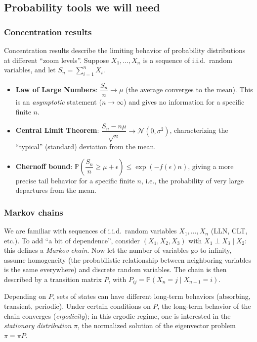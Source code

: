 \subsection{Probability tools we will need}

\subsubsection*{Concentration results}

Concentration results describe the limiting behavior of probability distributions at different ``zoom levels''. Suppose $X_1, \dots, X_n$ is a sequence of i.i.d.\ random variables, and let $S_n = \sum_{i=1}^n X_i$.

\begin{itemize}
    \item \textbf{Law of Large Numbers}: $\dfrac{S_n}{n} \to \mu$ (the average converges to the mean). This is an \emph{asymptotic} statement ($n \to \infty$) and gives no information for a specific finite $n$.
    \item \textbf{Central Limit Theorem}: $\dfrac{S_n - n\mu}{\sqrt{n}} \to \mathcal{N}(0, \sigma^2)$, characterizing the ``typical'' (standard) deviation from the mean.
    \item \textbf{Chernoff bound}: $\mathbb{P}\left(\dfrac{S_n}{n} \geq \mu + \epsilon\right) \leq \exp(-f(\epsilon) n)$, giving a more precise tail behavior for a specific finite $n$, i.e., the probability of very large departures from the mean.
\end{itemize}

\subsubsection*{Markov chains}

We are familiar with sequences of i.i.d.\ random variables $X_1, \dots, X_n$ (LLN, CLT, etc.). To add ``a bit of dependence'', consider $(X_1, X_2, X_3)$ with $X_1 \perp X_3 \mid X_2$: this defines a \emph{Markov chain}. Now let the number of variables go to infinity, assume homogeneity (the probabilistic relationship between neighboring variables is the same everywhere) and discrete random variables. The chain is then described by a transition matrix $P$, with $P_{ij} = \mathbb{P}(X_n = j \mid X_{n-1} = i)$.

Depending on $P$, sets of states can have different long-term behaviors (absorbing, transient, periodic). Under certain conditions on $P$, the long-term behavior of the chain converges (\emph{ergodicity}); in this ergodic regime, one is interested in the \emph{stationary distribution} $\pi$, the normalized solution of the eigenvector problem $\pi = \pi P$.

